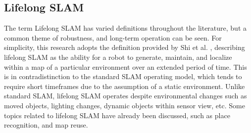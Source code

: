 \subsection{Lifelong SLAM}

The term Lifelong SLAM has varied definitions throughout the literature, but a common theme of robustness, and long-term operation can be seen. For simplicity, this research adopts the definition provided by Shi et al. \cite{shiAreWeReady2020}, describing lifelong SLAM as the ability for a robot to generate, maintain, and localize within a map of a particular environment over an extended period of time. This is in contradistinction to the standard SLAM operating model, which tends to require short timeframes due to the assumption of a static environment. Unlike standard SLAM, lifelong SLAM operates despite environmental changes such as moved objects, lighting changes, dynamic objects within sensor view, etc. Some topics related to lifelong SLAM have already been discussed, such as place recognition, and map reuse.